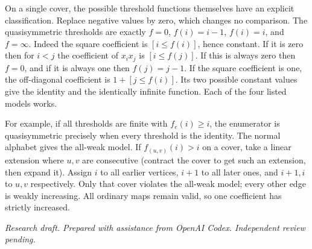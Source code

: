 \documentclass[11pt]{article}
\begin{document}
On a single cover, the possible threshold functions themselves have an explicit classification. Replace negative values by zero, which changes no comparison. The quasisymmetric thresholds are exactly $f=0$, $f(i)=i-1$, $f(i)=i$, and $f=\infty$. Indeed the square coefficient is $[i\le f(i)]$, hence constant. If it is zero then for $i<j$ the coefficient of $x_ix_j$ is $[i\le f(j)]$. If this is always zero then $f=0$, and if it is always one then $f(j)=j-1$. If the square coefficient is one, the off-diagonal coefficient is $1+[j\le f(i)]$. Its two possible constant values give the identity and the identically infinite function. Each of the four listed models works.

For example, if all thresholds are finite with $f_e(i)\ge i$, the enumerator is quasisymmetric precisely when every threshold is the identity. The normal alphabet gives the all-weak model. If $f_{(u,v)}(i)>i$ on a cover, take a linear extension where $u,v$ are consecutive (contract the cover to get such an extension, then expand it). Assign $i$ to all earlier vertices, $i+1$ to all later ones, and $i+1,i$ to $u,v$ respectively. Only that cover violates the all-weak model; every other edge is weakly increasing. All ordinary maps remain valid, so one coefficient has strictly increased.

\medskip\noindent\textit{Research draft. Prepared with assistance from OpenAI Codex. Independent review pending.}
\end{document}
